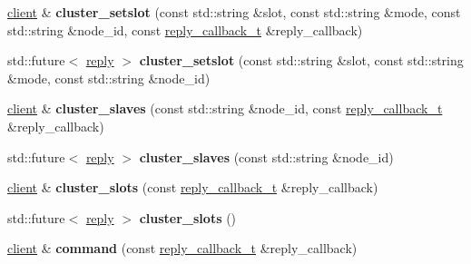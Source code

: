 \begin{DoxyCompactItemize}
\item 
\mbox{\label{classcpp__redis_1_1client_a4e87a3163d16db267136a127e5c843e2}} 
\hyperlink{classcpp__redis_1_1client}{client} \& {\bfseries cluster\+\_\+setslot} (const std\+::string \&slot, const std\+::string \&mode, const std\+::string \&node\+\_\+id, const \hyperlink{classcpp__redis_1_1client_a061a1140d36d2eaeda82b09a0bb3f9f2}{reply\+\_\+callback\+\_\+t} \&reply\+\_\+callback)
\item 
\mbox{\label{classcpp__redis_1_1client_a824c1234198e48badeccf4190b610e32}} 
std\+::future$<$ \hyperlink{classcpp__redis_1_1reply}{reply} $>$ {\bfseries cluster\+\_\+setslot} (const std\+::string \&slot, const std\+::string \&mode, const std\+::string \&node\+\_\+id)
\item 
\mbox{\label{classcpp__redis_1_1client_ac03fb62a9eb5abbb5248bc38fd4dfb5e}} 
\hyperlink{classcpp__redis_1_1client}{client} \& {\bfseries cluster\+\_\+slaves} (const std\+::string \&node\+\_\+id, const \hyperlink{classcpp__redis_1_1client_a061a1140d36d2eaeda82b09a0bb3f9f2}{reply\+\_\+callback\+\_\+t} \&reply\+\_\+callback)
\item 
\mbox{\label{classcpp__redis_1_1client_afbfca7fb91f492768c7ac75677f433a2}} 
std\+::future$<$ \hyperlink{classcpp__redis_1_1reply}{reply} $>$ {\bfseries cluster\+\_\+slaves} (const std\+::string \&node\+\_\+id)
\item 
\mbox{\label{classcpp__redis_1_1client_a7d0dad34ca2fe2e301b202388bb47e10}} 
\hyperlink{classcpp__redis_1_1client}{client} \& {\bfseries cluster\+\_\+slots} (const \hyperlink{classcpp__redis_1_1client_a061a1140d36d2eaeda82b09a0bb3f9f2}{reply\+\_\+callback\+\_\+t} \&reply\+\_\+callback)
\item 
\mbox{\label{classcpp__redis_1_1client_a9dc222141ab85da05efbce7a7ff0a7d1}} 
std\+::future$<$ \hyperlink{classcpp__redis_1_1reply}{reply} $>$ {\bfseries cluster\+\_\+slots} ()
\item 
\mbox{\label{classcpp__redis_1_1client_accac4fab4be3f71b94fc0aa02496f6a3}} 
\hyperlink{classcpp__redis_1_1client}{client} \& {\bfseries command} (const \hyperlink{classcpp__redis_1_1client_a061a1140d36d2eaeda82b09a0bb3f9f2}{reply\+\_\+callback\+\_\+t} \&reply\+\_\+callback)

\end{DoxyCompactItemize}
